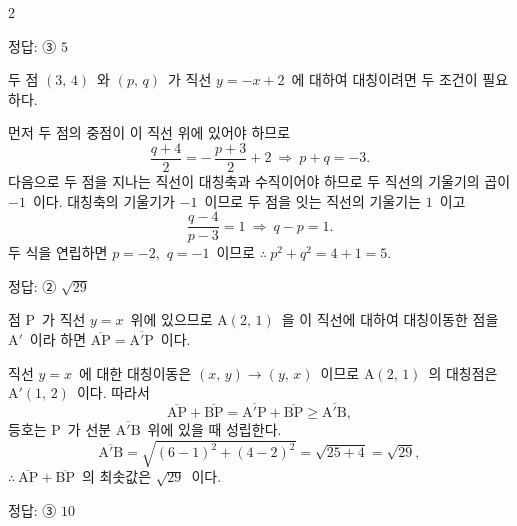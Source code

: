 \documentclass[10pt,fleqn]{article}
\begin{document}
\begin{multicols*}{2}
\begin{dmanswerbox}
정답: ③ $5$
\end{dmanswerbox}

두 점 $(3,\,4)$\ 와 $(p,\,q)$\ 가 직선 $y = -x + 2$\ 에 대하여 대칭이려면 두 조건이 필요하다.

먼저 두 점의 중점이 이 직선 위에 있어야 하므로
\[ \dfrac{q+4}{2} = -\,\dfrac{p+3}{2} + 2\ \Longrightarrow\ p + q = -3. \]
다음으로 두 점을 지나는 직선이 대칭축과 수직이어야 하므로 두 직선의 기울기의 곱이 $-1$\ 이다. 대칭축의 기울기가 $-1$\ 이므로 두 점을 잇는 직선의 기울기는 $1$\ 이고
\[ \dfrac{q - 4}{p - 3} = 1\ \Longrightarrow\ q - p = 1. \]
두 식을 연립하면 $p = -2$,\ $q = -1$\ 이므로 $\therefore\ p^2 + q^2 = 4 + 1 = 5$.

\begin{dmanswerbox}
정답: ② $\sqrt{29}$
\end{dmanswerbox}

점 $\mathrm{P}$\ 가 직선 $y = x$\ 위에 있으므로 $\mathrm{A}(2,\,1)$\ 을 이 직선에 대하여 대칭이동한 점을 $\mathrm{A}'$\ 이라 하면 $\overline{\mathrm{AP}} = \overline{\mathrm{A}'\mathrm{P}}$\ 이다.

직선 $y = x$\ 에 대한 대칭이동은 $(x,\,y) \to (y,\,x)$\ 이므로 $\mathrm{A}(2,\,1)$\ 의 대칭점은 $\mathrm{A}'(1,\,2)$\ 이다. 따라서
\[ \overline{\mathrm{AP}} + \overline{\mathrm{BP}} = \overline{\mathrm{A}'\mathrm{P}} + \overline{\mathrm{BP}} \ge \overline{\mathrm{A}'\mathrm{B}}, \]
등호는 $\mathrm{P}$\ 가 선분 $\overline{\mathrm{A}'\mathrm{B}}$\ 위에 있을 때 성립한다.
\[ \overline{\mathrm{A}'\mathrm{B}} = \sqrt{(6-1)^2 + (4-2)^2} = \sqrt{25 + 4} = \sqrt{29}, \]
$\therefore\ \overline{\mathrm{AP}} + \overline{\mathrm{BP}}$\ 의 최솟값은 $\sqrt{29}$\ 이다.

\begin{dmanswerbox}
정답: ③ $10$
\end{dmanswerbox}


\end{multicols*}
\end{document}
